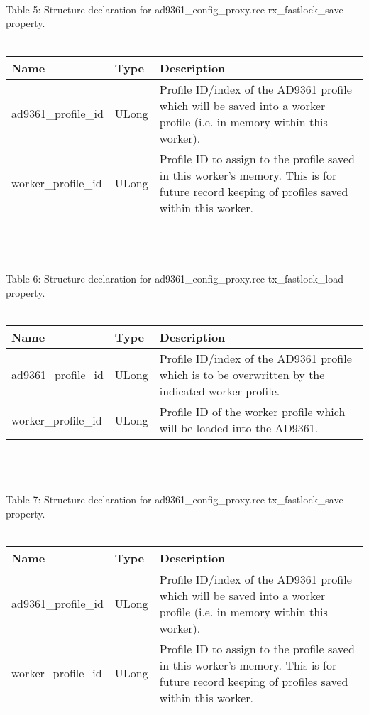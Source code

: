 \documentclass{article}
\def\comp{ad9361\_config\_proxy}
\begin{document}
\begin{landscape}
\begin{scriptsize}
	\end{scriptsize}\\ \\ \\
	Table \hypertarget{tab5}{5}: Structure declaration for \comp{}.rcc rx\_fastlock\_save property.\\ \\
		\begin{scriptsize}
		\begin{tabular}{|p{4.7cm}|p{2.7cm}|p{13.77cm}|} \hline \cellcolor{blue} Name & \cellcolor{blue}Type & \cellcolor{blue}Description \\ \hline ad9361\_profile\_id & ULong & Profile ID/index of the AD9361 profile which will be saved into a worker profile (i.e. in memory within this worker). \\ \hline worker\_profile\_id & ULong & Profile ID to assign to the profile saved in this worker's memory. This is for future record keeping of profiles saved within this worker. \\ \hline \end{tabular}
	\end{scriptsize}\\ \\ \\
	Table \hypertarget{tab6}{6}: Structure declaration for \comp{}.rcc tx\_fastlock\_load property.\\ \\
		\begin{scriptsize}
\begin{tabular}{|p{4.7cm}|p{2.7cm}|p{13.77cm}|} \hline \cellcolor{blue} Name & \cellcolor{blue}Type & \cellcolor{blue}Description \\ \hline ad9361\_profile\_id & ULong & Profile ID/index of the AD9361 profile which is to be overwritten by the indicated worker profile. \\ \hline worker\_profile\_id & ULong & Profile ID of the worker profile which will be loaded into the AD9361. \\ \hline \end{tabular}
	\end{scriptsize}\\ \\ \\
	Table \hypertarget{tab7}{7}: Structure declaration for \comp{}.rcc tx\_fastlock\_save property.\\ \\
		\begin{scriptsize}
\begin{tabular}{|p{4.7cm}|p{2.7cm}|p{13.77cm}|} \hline \cellcolor{blue} Name & \cellcolor{blue}Type & \cellcolor{blue}Description \\ \hline ad9361\_profile\_id & ULong & Profile ID/index of the AD9361 profile which will be saved into a worker profile (i.e. in memory within this worker). \\ \hline worker\_profile\_id & ULong & Profile ID to assign to the profile saved in this worker's memory. This is for future record keeping of profiles saved within this worker.\\ \hline \end{tabular}

\end{scriptsize}
\end{landscape}
\end{document}
